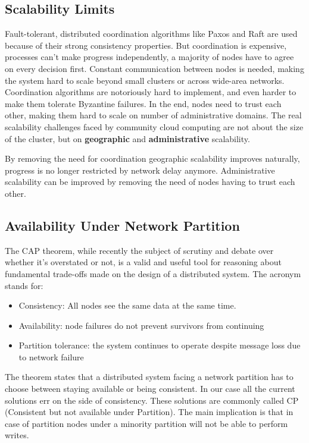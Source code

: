 \documentclass{sig-alternate}
\begin{document}
\subsection{Scalability Limits}

Fault-tolerant, distributed coordination algorithms like Paxos and Raft are used because of their strong consistency properties. But coordination is expensive, processes can't make progress independently, a majority of nodes have to agree on every decision first. Constant communication between nodes is needed, making the system hard to scale beyond small clusters or across wide-area networks. Coordination algorithms are notoriously hard to implement, and even harder to make them tolerate Byzantine failures. In the end, nodes need to trust each other, making them hard to scale on number of administrative domains. The real scalability challenges faced by community cloud computing are not about the size of the cluster, but on \textbf{geographic} and \textbf{administrative} scalability.

By removing the need for coordination geographic scalability improves naturally, progress is no longer restricted by network delay anymore. Administrative scalability can be improved by removing the need of nodes having to trust each other. 

\subsection{Availability Under Network Partition}

The CAP theorem, while recently the subject of scrutiny and debate over whether it's overstated or not\cite{Kleppmann:CAP}, is a valid and useful tool for reasoning about fundamental trade-offs made on the design of a distributed system. The acronym stands for:

\begin{itemize}
\item Consistency: All nodes see the same data at the same time.
\item Availability: node failures do not prevent survivors from continuing
\item Partition tolerance: the system continues to operate despite message loss due to network failure
\end{itemize}
    
The theorem states that a distributed system facing a network partition has to choose between staying available or being consistent. In our case all the current solutions err on the side of consistency. These solutions are commonly called CP (Consistent but not available under Partition). The main implication is that in case of partition nodes under a minority partition will not be able to perform writes.
\end{document}
